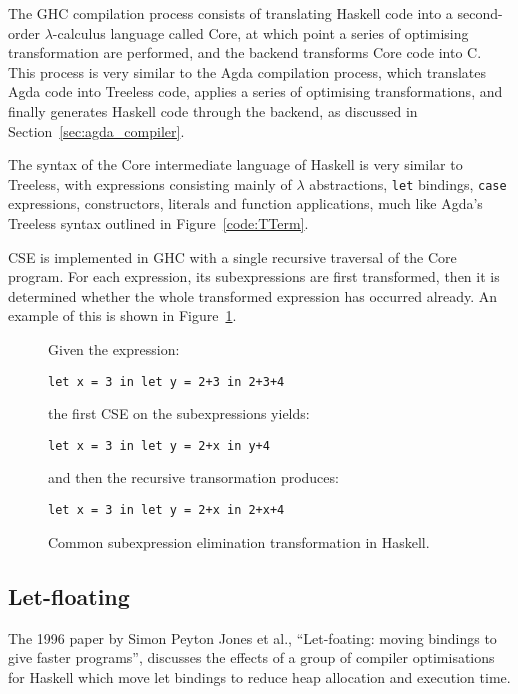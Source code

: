 The GHC compilation process consists of translating Haskell code into a second-order $\lambda$-calculus language called Core, at which point a series of optimising transformation are performed, and the backend transforms Core code into C.\cite{chitil1997} This process is very similar to the Agda compilation process, which translates Agda code into Treeless code, applies a series of optimising transformations, and finally generates Haskell code through the backend, as discussed in Section~\ref{sec:agda_compiler}. 

The syntax of the Core intermediate language of Haskell is very similar to Treeless, with expressions consisting mainly of $\lambda$ abstractions, \lstinline{let} bindings, \lstinline{case} expressions, constructors, literals and function applications, much like Agda's Treeless syntax outlined in Figure~\ref{code:TTerm}.

CSE is implemented in GHC with a single recursive traversal of the Core program. For each expression, its subexpressions are first transformed, then it is determined whether the whole transformed expression has occurred already.\cite{chitil1997} An example of this is shown in Figure~\ref{code:cse_haskell}.

\begin{figure}
Given the expression:

\lstinline{let x = 3 in let y = 2+3 in 2+3+4}

the first CSE on the subexpressions yields:

\lstinline{let x = 3 in let y = 2+x in y+4}

and then the recursive transormation produces:

\lstinline{let x = 3 in let y = 2+x in 2+x+4}

\caption{Common subexpression elimination transformation in Haskell.\cite{chitil1997}}
\label{code:cse_haskell}
\end{figure}

\subsection{Let-floating}

The 1996 paper by Simon Peyton Jones et al., ``Let-foating: moving bindings to give faster programs'', discusses the effects of a group of compiler optimisations for Haskell which move let bindings to reduce heap allocation and execution time.\cite{jones1996}

